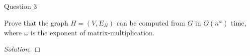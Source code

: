 \begin{solution}{Question 3}\label{ques:3}
    \begin{question}
        Prove that the graph $H = (V, E_H)$ can be computed from $G$ in $O(n^\omega)$ time, where $\omega$ is the exponent of matrix-multiplication.
    \end{question}
    \tcblower{}
    \begin{proof}[Solution]
    \end{proof}
\end{solution}

